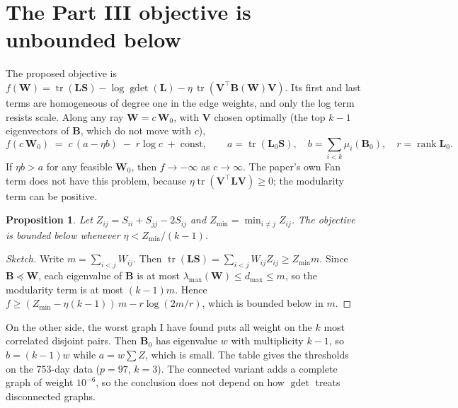 \documentclass[11pt,a4paper]{article}
\newcommand{\Lap}{\mathbf{L}}
\newcommand{\Wmat}{\mathbf{W}}
\newcommand{\Bmat}{\mathbf{B}}
\newcommand{\Smat}{\mathbf{S}}
\newcommand{\Vmat}{\mathbf{V}}
\newcommand{\tr}{\operatorname{tr}}
\newtheorem{proposition}{Proposition}
\begin{document}
\section{The Part III objective is unbounded below}\label{sec:unbounded}

The proposed objective is
$f(\Wmat)=\tr(\Lap\Smat)-\log\operatorname{gdet}(\Lap)-\eta\,\tr(\Vmat^\top\Bmat(\Wmat)\Vmat)$.
Its first and last terms are homogeneous of degree one in the edge weights, and only
the log term resists scale. Along any ray $\Wmat=c\,\Wmat_0$, with $\Vmat$ chosen
optimally (the top $k-1$ eigenvectors of $\Bmat$, which do not move with $c$),
\[
  f(c\,\Wmat_0)\;=\;c\,(a-\eta b)\;-\;r\log c\;+\;\text{const},\qquad
  a=\tr(\Lap_0\Smat),\quad b=\textstyle\sum_{i<k}\mu_i(\Bmat_0),\quad r=\operatorname{rank}\Lap_0 .
\]
If $\eta b>a$ for any feasible $\Wmat_0$, then $f\to-\infty$ as $c\to\infty$. The
paper's own Fan term does not have this problem, because
$\eta\tr(\Vmat^\top\Lap\Vmat)\ge 0$; the modularity term can be positive.

\begin{proposition}
Let $Z_{ij}=S_{ii}+S_{jj}-2S_{ij}$ and $Z_{\min}=\min_{i\neq j}Z_{ij}$. The
objective is bounded below whenever $\eta<Z_{\min}/(k-1)$.
\end{proposition}
\begin{proof}[Sketch]
Write $m=\sum_{i<j}W_{ij}$. Then $\tr(\Lap\Smat)=\sum_{i<j}W_{ij}Z_{ij}\ge Z_{\min}m$.
Since $\Bmat\preceq\Wmat$, each eigenvalue of $\Bmat$ is at most
$\lambda_{\max}(\Wmat)\le d_{\max}\le m$, so the modularity term is at most $(k-1)m$.
Hence $f\ge(Z_{\min}-\eta(k-1))\,m-r\log(2m/r)$, which is bounded below in $m$.
\end{proof}

On the other side, the worst graph I have found puts all weight on the $k$ most
correlated disjoint pairs. Then $\Bmat_0$ has eigenvalue $w$ with multiplicity $k-1$,
so $b=(k-1)w$ while $a=w\sum Z$, which is small. The table gives the thresholds on
the 753-day data ($p=97$, $k=3$). The connected variant adds a complete graph of
weight $10^{-6}$, so the conclusion does not depend on how $\operatorname{gdet}$
treats disconnected graphs.
\end{document}
